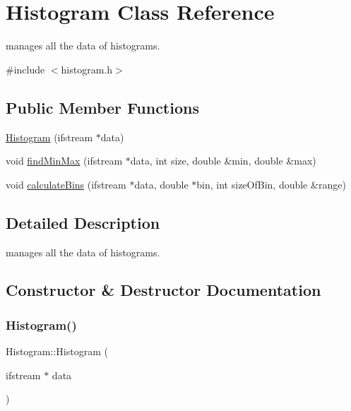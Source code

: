 \hypertarget{class_histogram}{}\section{Histogram Class Reference}
\label{class_histogram}


manages all the data of histograms.  




{\ttfamily \#include $<$histogram.\+h$>$}

\subsection*{Public Member Functions}
\begin{DoxyCompactItemize}
\item 
\hyperlink{class_histogram_a1fdadf17fc180d746c541b879c93335d}{Histogram} (ifstream $\ast$data)
\item 
void \hyperlink{class_histogram_adb7101f7cc831bc8265ebd5d56b3b553}{find\+Min\+Max} (ifstream $\ast$data, int size, double \&min, double \&max)
\item 
void \hyperlink{class_histogram_a0554e0adfcd84b7524d27079d7f23729}{calculate\+Bins} (ifstream $\ast$data, double $\ast$bin, int size\+Of\+Bin, double \&range)
\end{DoxyCompactItemize}


\subsection{Detailed Description}
manages all the data of histograms. 

\subsection{Constructor \& Destructor Documentation}
\mbox{\label{class_histogram_a1fdadf17fc180d746c541b879c93335d}} 
\subsubsection{\texorpdfstring{Histogram()}{Histogram()}}
{\footnotesize\ttfamily Histogram\+::\+Histogram (\begin{DoxyParamCaption}\item[{ifstream $\ast$}]{data }\end{DoxyParamCaption})}

